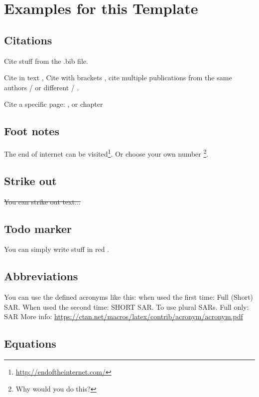 
\chapter{Examples for this Template}
\section{Citations}
Cite stuff from the .bib file. 

Cite in text \cite{CostantiniPSP}, Cite with brackets \citep{Schneider2021b}, cite multiple publications from the same authors \cite{Schneider2021b,Schneider2021a} / \citep{Schneider2021b,Schneider2021a} or different \citep{Schneider2021b,CostantiniPSP} / \cite{Schneider2021b,CostantiniPSP}. 

Cite a specific page:  \cite[see][p. 42]{Schneider2021b}, or chapter \cite[compare ][Ch. 3]{Schneider2021a} 

\section{Foot notes}
The end of internet can be visited\footnote{\url{http://endoftheinternet.com/}}. 
Or choose your own number \footnote[42]{Why would you do this?}.

\section{Strike out}

\sout{You can strike out text...}
\section{Todo marker}

You can simply write stuff in red .

\section{Abbreviations} 
You can use the defined acronyms like this: when used the first time: Full (Short) \ac{SAR}. When used the second time: SHORT \ac{SAR}. To use plural \acp{SAR}. Full only: \acl{SAR}
More info: \url{https://ctan.net/macros/latex/contrib/acronym/acronym.pdf}

\section{Equations} 

